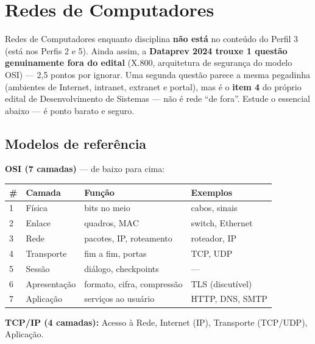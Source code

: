 \chapter{Redes de Computadores}
\label{cap:redes}

\begin{pegadinha}
Redes de Computadores enquanto disciplina \textbf{não está} no conteúdo do
Perfil 3 (está nos Perfis 2 e 5). Ainda assim, a \textbf{Dataprev 2024 trouxe
1 questão genuinamente fora do edital} (X.800, arquitetura de segurança do
modelo OSI) --- 2,5 pontos por ignorar. Uma segunda questão parece a mesma
pegadinha (ambientes de Internet, intranet, extranet e portal), mas é o
\textbf{item 4} do próprio edital de Desenvolvimento de Sistemas --- não é
rede ``de fora''. Estude o essencial abaixo --- é ponto barato e seguro.
\end{pegadinha}

\section{Modelos de referência}

\textbf{OSI (7 camadas)} --- de baixo para cima:

\begin{center}
\begin{tabular}{@{}p{0.6cm}p{2.2cm}p{4cm}p{3cm}@{}}
\toprule
\# & \textbf{Camada} & \textbf{Função} & \textbf{Exemplos} \\
\midrule
1 & Física & bits no meio & cabos, sinais \\
2 & Enlace & quadros, MAC & switch, Ethernet \\
3 & Rede & pacotes, IP, roteamento & roteador, IP \\
4 & Transporte & fim a fim, portas & TCP, UDP \\
5 & Sessão & diálogo, checkpoints & --- \\
6 & Apresentação & formato, cifra, compressão & TLS (discutível) \\
7 & Aplicação & serviços ao usuário & HTTP, DNS, SMTP \\
\bottomrule
\end{tabular}
\end{center}

\textbf{TCP/IP (4 camadas):} Acesso à Rede, Internet (IP), Transporte
(TCP/UDP), Aplicação.

